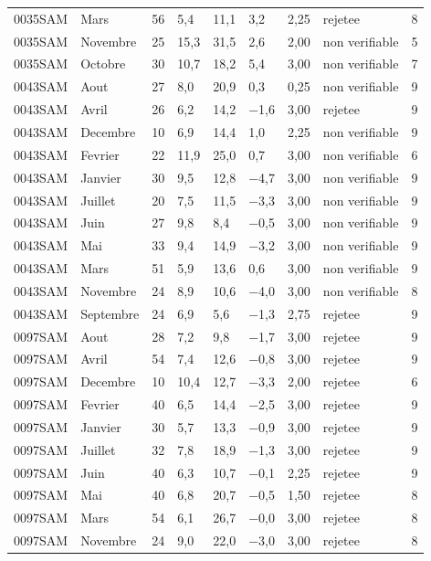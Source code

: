 \begin{table}[htbp]
\begin{tabular}{llrlllllr}
0035SAM & Mars & 56 & 5,4 & 11,1 & 3,2 & 2,25 & rejetee & 8 \\
0035SAM & Novembre & 25 & 15,3 & 31,5 & 2,6 & 2,00 & non verifiable & 5 \\
0035SAM & Octobre & 30 & 10,7 & 18,2 & 5,4 & 3,00 & non verifiable & 7 \\
0043SAM & Aout & 27 & 8,0 & 20,9 & 0,3 & 0,25 & non verifiable & 9 \\
0043SAM & Avril & 26 & 6,2 & 14,2 & −1,6 & 3,00 & rejetee & 9 \\
0043SAM & Decembre & 10 & 6,9 & 14,4 & 1,0 & 2,25 & non verifiable & 9 \\
0043SAM & Fevrier & 22 & 11,9 & 25,0 & 0,7 & 3,00 & non verifiable & 6 \\
0043SAM & Janvier & 30 & 9,5 & 12,8 & −4,7 & 3,00 & non verifiable & 9 \\
0043SAM & Juillet & 20 & 7,5 & 11,5 & −3,3 & 3,00 & non verifiable & 9 \\
0043SAM & Juin & 27 & 9,8 & 8,4 & −0,5 & 3,00 & non verifiable & 9 \\
0043SAM & Mai & 33 & 9,4 & 14,9 & −3,2 & 3,00 & non verifiable & 9 \\
0043SAM & Mars & 51 & 5,9 & 13,6 & 0,6 & 3,00 & non verifiable & 9 \\
0043SAM & Novembre & 24 & 8,9 & 10,6 & −4,0 & 3,00 & non verifiable & 8 \\
0043SAM & Septembre & 24 & 6,9 & 5,6 & −1,3 & 2,75 & rejetee & 9 \\
0097SAM & Aout & 28 & 7,2 & 9,8 & −1,7 & 3,00 & rejetee & 9 \\
0097SAM & Avril & 54 & 7,4 & 12,6 & −0,8 & 3,00 & rejetee & 9 \\
0097SAM & Decembre & 10 & 10,4 & 12,7 & −3,3 & 2,00 & rejetee & 6 \\
0097SAM & Fevrier & 40 & 6,5 & 14,4 & −2,5 & 3,00 & rejetee & 9 \\
0097SAM & Janvier & 30 & 5,7 & 13,3 & −0,9 & 3,00 & rejetee & 9 \\
0097SAM & Juillet & 32 & 7,8 & 18,9 & −1,3 & 3,00 & rejetee & 9 \\
0097SAM & Juin & 40 & 6,3 & 10,7 & −0,1 & 2,25 & rejetee & 9 \\
0097SAM & Mai & 40 & 6,8 & 20,7 & −0,5 & 1,50 & rejetee & 8 \\
0097SAM & Mars & 54 & 6,1 & 26,7 & −0,0 & 3,00 & rejetee & 8 \\
0097SAM & Novembre & 24 & 9,0 & 22,0 & −3,0 & 3,00 & rejetee & 8 \\

\end{tabular}
\end{table}
